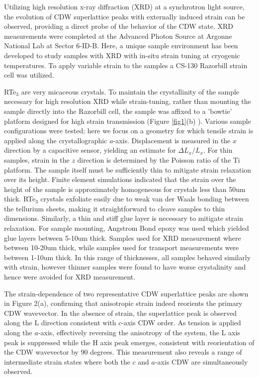 \documentclass[%
 reprint, %
amsmath,amssymb,
aps,
]{revtex4-2}
\begin{document}
Utilizing high resolution x-ray diffraction (XRD) at a synchrotron light source, the evolution of CDW superlattice peaks with externally induced strain can be observed, providing a direct probe of the behavior of the CDW state. XRD measurements were completed at the Advanced Photon Source at Argonne National Lab at Sector 6-ID-B. Here, a unique sample environment has been developed to study samples with XRD with in-situ strain tuning at cryogenic temperatures.\cite{Sanchez2019} To apply variable strain to the samples a CS-130 Razorbill strain cell was utilized.\cite{Hicks2014}  

RTe$_3$ are very micaceous crystals. To maintain the crystallinity of the sample necessary for high resolution XRD while strain-tuning, rather than mounting the sample directly into the Razorbill cell, the sample was affixed to a 'bowtie' platform designed for high strain transmission (Figure \ref{fig1}(b) \cite{Park2020}). Various sample configurations were tested; here we focus on a geometry for which tensile strain is applied along the crystallographic $a$-axis. Displacement is measured in the $x$ direction by a capacitive sensor, yielding an estimate for $\Delta L_x/L_x$. For thin samples, strain in the $z$ direction is determined by the Poisson ratio of the Ti platform. The sample itself must be sufficiently thin to mitigate strain relaxation over its  height. Finite element simulations indicated that the strain over the height of the sample is approximately homogeneous for crystals less than 50um thick. RTe$_3$ crystals exfoliate easily due to weak van der Waals bonding between the tellurium sheets, making it straightforward to cleave samples to thin dimensions. Similarly, a thin and stiff glue layer is necessary to mitigate strain relaxation. For sample mounting, Angstrom Bond epoxy was used which yielded glue layers between 5-10um thick. Samples used for XRD measurement where between 10-20um thick, while samples used for transport measurements were between 1-10um thick. In this range of thicknesses, all samples behaved similarly with strain, however thinner samples were found to have worse crystalinity and hence were avoided for XRD measurement. 

The strain-dependence of two representative CDW superlattice peaks are shown in Figure 2(a), confirming that anisotropic strain indeed reorients the primary CDW wavevector. In the absence of strain, the superlattice peak is observed along the L direction consistent with $c$-axis CDW order. As tension is applied along the $a$-axis, effectively reversing the anisotropy of the system, the L axis peak is suppressed while the H axis peak emerges, consistent with reorientation of the CDW wavevector by 90 degrees. This measurement also reveals a range of intermediate strain states where both the $c$ and $a$-axis CDW are simultaneously observed. 
\end{document}
